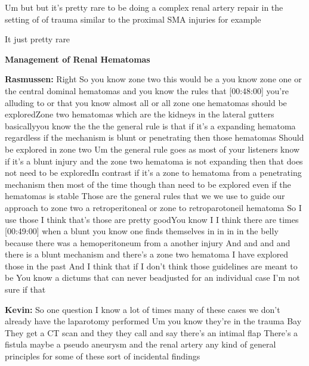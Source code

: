\documentclass[
]{book}
\begin{document}
Um but but it's pretty rare to be doing a complex renal artery repair in
the setting of of trauma similar to the proximal SMA injuries for
example

It just pretty rare

\textbf{Management of Renal Hematomas}

\textbf{Rasmussen:} Right So you know zone two this would be a you know zone
one or the central dominal hematomas and you know the rules that
{[}00:48:00{]} you're alluding to or that you know almost all or all zone
one hematomas should be exploredZone two hematomas which are the kidneys
in the lateral gutters\\
basicallyyou know the the the general rule is that if it's a expanding
hematoma regardless if the mechanism is blunt or penetrating then those
hematomas Should be explored in zone two Um the general rule goes as
most of your listeners know if it's a blunt injury and the zone two
hematoma is not expanding then that does not need to be exploredIn
contrast if it's a zone to hematoma from a penetrating mechanism then
most of the time though than need to be explored even if the hematomas
is stable Those are the general rules that we we use to guide our
approach to zone two a retroperitoneal or zone to retroparotoneil
hematoma So I use those I think that's those are pretty goodYou know I I
think there are times {[}00:49:00{]} when a blunt you know one finds
themselves in in in in the belly because there was a hemoperitoneum from
a another injury And and and and there is a blunt mechanism and there's
a zone two hematoma I have explored those in the past And I think that
if I don't think those guidelines are meant to be You know a dictums
that can never beadjusted for an individual case I'm not sure if that

\textbf{Kevin:} So one question I know a lot of times many of these cases we
don't already have the laparotomy performed Um you know they're in the
trauma Bay They get a CT scan and they they call and say there's an
intimal flap There's a fistula maybe a pseudo aneurysm and the renal
artery any kind of general principles for some of these sort of
incidental findings
\end{document}
